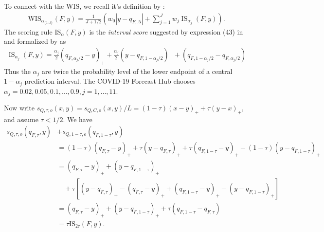 \documentclass{article}
\begin{document}
To connect with the WIS, we recall it's definition by \cite{bracher2021evaluating}:
\begin{align}
\mathrm{WIS}_{\alpha_{\{1: J\}}}(F, y)=\frac{1}{J+1 / 2}\left(w_0 |y-q_{F,.5}|+\sum_{j=1}^J w_j \operatorname{IS}_{\alpha_j}(F, y)\right).
\end{align}
The scoring rule $\mathrm{IS}_{\alpha}(F,y)$ is the \emph{interval score} suggested by expression (43) in \cite{gneiting2007strictly} 
and formalized by \cite{bracher2021evaluating} as
\begin{align}
\operatorname{IS}_{\alpha_j}(F, y) = \frac{\alpha_j}{2}(q_{F,\alpha_j/2}-y)_+ + \frac{\alpha_j}{2}(y-q_{F,1-\alpha_j/2})_+ 
 + (q_{F,1-\alpha_j/2} - q_{F,\alpha_j/2})
\end{align}
Thus the $\alpha_j$ are twice the probability level of the lower endpoint of a central
$1-\alpha_j$ prediction interval. The COVID-19 Forecast Hub chooses $\alpha_j=0.02, 0.05, 0.1, \ldots, 0.9, j = 1,\ldots,11$. 

Now write $s_{Q,\tau, o}(x,y) = s_{Q,C, o}(x,y)/L = (1-\tau)(x-y)_+ + \tau(y-x)_+$, 
and assume $\tau < 1/2$.  We have
\begin{align}
s_{Q,\tau,o}(q_{F,\tau},y) &+ s_{Q,1-\tau,o}(q_{F,1-\tau},y) \\
&= (1-\tau)(q_{F,\tau}-y)_+ + \tau(y-q_{F,\tau})_+ 
+ \tau(q_{F,1-\tau}-y)_+ + (1-\tau)(y-q_{F,1-\tau})_+ \\ 
&= (q_{F,\tau}-y)_+ + (y-q_{F,1-\tau})_+ \\
&\quad + \tau \left[(y-q_{F,\tau})_+ - (q_{F,\tau}-y)_+ + (q_{F,1-\tau}-y)_+ - (y-q_{F,1-\tau})_+\right] \\
&= (q_{F,\tau}-y)_+ + (y-q_{F,1-\tau})_+  + \tau(q_{F,1-\tau} - q_{F,\tau}) \\
&= \tau \mathrm{IS}_{2\tau}(F,y). \label{eqn:pinball_IS}
\end{align}
\end{document}
